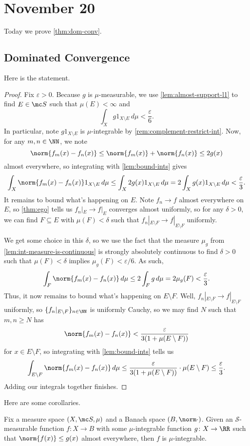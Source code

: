 \documentclass[../notes.tex]{subfiles}
\begin{document}
\section{November 20}

Today we prove \autoref{thm:dom-conv}.

\subsection{Dominated Convergence}
Here is the statement.
\domconvthm*
\begin{proof}
	Fix $\varepsilon>0$. Because $g$ is $\mu$-measurable, we use \autoref{lem:almost-support-l1} to find $E\in\mc S$ such that $\mu(E)<\infty$ and
	\[\int_Xg1_{X\setminus E}\,d\mu<\frac\varepsilon6.\]
	In particular, note $g1_{X\setminus E}$ is $\mu$-integrable by \autoref{rem:complement-restrict-int}. Now, for any $m,n\in\NN$, we note
	\[\norm{f_m(x)-f_n(x)}\le\norm{f_m(x)}+\norm{f_n(x)}\le2g(x)\]
	almost everywhere, so integrating with \autoref{lem:bound-ints} gives
	\[\int_X\norm{f_m(x)-f_n(x)}1_{X\setminus E}\,d\mu\le\int_X2g(x)1_{X\setminus E}\,d\mu=2\int_Xg(x)1_{X\setminus E}\,d\mu<\frac\varepsilon3.\]
	It remains to bound what's happening on $E$. Note $f_n\to f$ almost everywhere on $E$, so \autoref{thm:ego} tells us $f_n|_E\to f|_E$ converges almost uniformly, so for any $\delta>0$, we can find $F\subseteq E$ with $\mu(F)<\delta$ such that $f_n|_{E\setminus F}\to f|_{E\setminus F}$ uniformly.
	
	We get some choice in this $\delta$, so we use the fact that the measure $\mu_g$ from \autoref{lem:int-measure-is-continuous} is strongly absolutely continuous to find $\delta>0$ such that $\mu(F)<\delta$ implies $\mu_g(F)<\varepsilon/6$. As such,
	\[\int_F\norm{f_m(x)-f_n(x)}\,d\mu\le2\int_Fg\,d\mu=2\mu_g(F)<\frac\varepsilon3.\]
	Thus, it now remains to bound what's happening on $E\setminus F$. Well, $f_n|_{E\setminus F}\to f|_{E\setminus F}$ uniformly, so $\{f_n|_{E\setminus F}\}_{n\in\NN}$ is uniformly Cauchy, so we may find $N$ such that $m,n\ge N$ has
	\[\norm{f_m(x)-f_n(x)}<\frac\varepsilon{3(1+\mu(E\setminus F))}\]
	for $x\in E\setminus F$, so integrating with \autoref{lem:bound-ints} tells us
	\[\int_{E\setminus F}\norm{f_m(x)-f_n(x)}\,d\mu\le\frac\varepsilon{3(1+\mu(E\setminus F))}\cdot\mu(E\setminus F)\le\frac\varepsilon3.\]
	Adding our integrals together finishes.
\end{proof}
Here are some corollaries.
\begin{corollary}
	Fix a measure space $(X,\mc S,\mu)$ and a Banach space $(B,\norm\cdot)$. Given an $\mathcal S$-measurable function $f\colon X\to B$ with some $\mu$-integrable function $g\colon X\to\RR$ such that $\norm{f(x)}\le g(x)$ almost everywhere, then $f$ is $\mu$-integrable.
\end{corollary}
\end{document}
